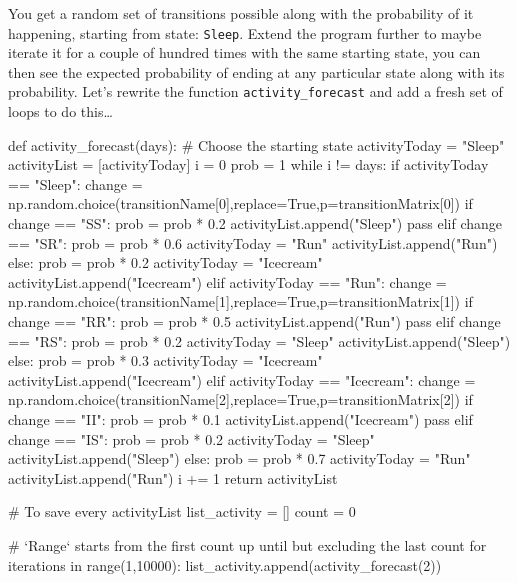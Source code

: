 You get a random set of transitions possible along with the probability of it happening, starting from state: \texttt{Sleep}. Extend the program further to maybe iterate it for a couple of hundred times with the same starting state, you can then see the expected probability of ending at any particular state along with its probability. Let's rewrite the function \texttt{activity_forecast} and add a fresh set of loops to do this\ldots

def activity_forecast(days):
    # Choose the starting state
    activityToday = "Sleep"
    activityList = [activityToday]
    i = 0
    prob = 1
    while i != days:
        if activityToday == "Sleep":
            change = np.random.choice(transitionName[0],replace=True,p=transitionMatrix[0])
            if change == "SS":
                prob = prob * 0.2
                activityList.append("Sleep")
                pass
            elif change == "SR":
                prob = prob * 0.6
                activityToday = "Run"
                activityList.append("Run")
            else:
                prob = prob * 0.2
                activityToday = "Icecream"
                activityList.append("Icecream")
        elif activityToday == "Run":
            change = np.random.choice(transitionName[1],replace=True,p=transitionMatrix[1])
            if change == "RR":
                prob = prob * 0.5
                activityList.append("Run")
                pass
            elif change == "RS":
                prob = prob * 0.2
                activityToday = "Sleep"
                activityList.append("Sleep")
            else:
                prob = prob * 0.3
                activityToday = "Icecream"
                activityList.append("Icecream")
        elif activityToday == "Icecream":
            change = np.random.choice(transitionName[2],replace=True,p=transitionMatrix[2])
            if change == "II":
                prob = prob * 0.1
                activityList.append("Icecream")
                pass
            elif change == "IS":
                prob = prob * 0.2
                activityToday = "Sleep"
                activityList.append("Sleep")
            else:
                prob = prob * 0.7
                activityToday = "Run"
                activityList.append("Run")
        i += 1    
    return activityList

# To save every activityList
list_activity = []
count = 0

# `Range` starts from the first count up until but excluding the last count
for iterations in range(1,10000):
        list_activity.append(activity_forecast(2))

